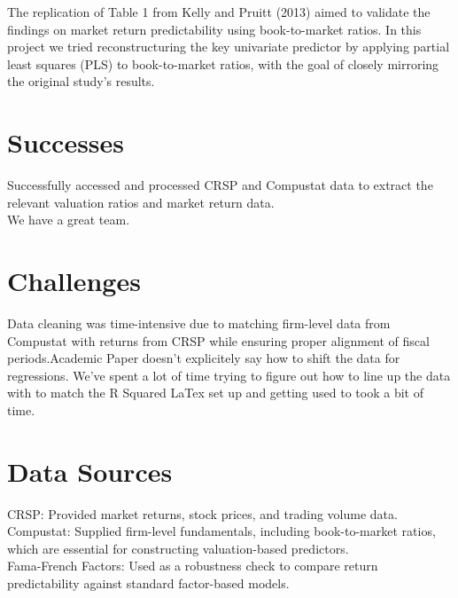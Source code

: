 \documentclass[12pt]{article}
\begin{document}
The replication of Table 1 from Kelly and Pruitt (2013) aimed to validate the 
findings on market return predictability using book-to-market ratios. In this project we 
tried reconstructuring the key univariate predictor by applying partial least squares (PLS) 
to book-to-market ratios, with the goal of closely mirroring the original study’s results.

\doublespacing
\section{Successes}
Successfully accessed and processed CRSP and Compustat data to extract the relevant valuation 
ratios and market return data.
\\We have a great team. 



\doublespacing
\section{Challenges}

Data cleaning was time-intensive due to matching firm-level data from Compustat with 
returns from CRSP while ensuring proper alignment of fiscal periods.Academic Paper doesn't 
explicitely say how to shift the data for regressions. 
We've spent a lot of time trying to figure out how to line up the data with to match the R Squared
LaTex set up and getting used to took a bit of time. 


\doublespacing
\section{Data Sources}

CRSP: Provided market returns, stock prices, and trading volume data.
\\Compustat: Supplied firm-level fundamentals, including book-to-market ratios, 
which are essential for constructing valuation-based predictors.
\\Fama-French Factors: Used as a robustness check to compare return predictability against standard factor-based models.\par
\end{document}
